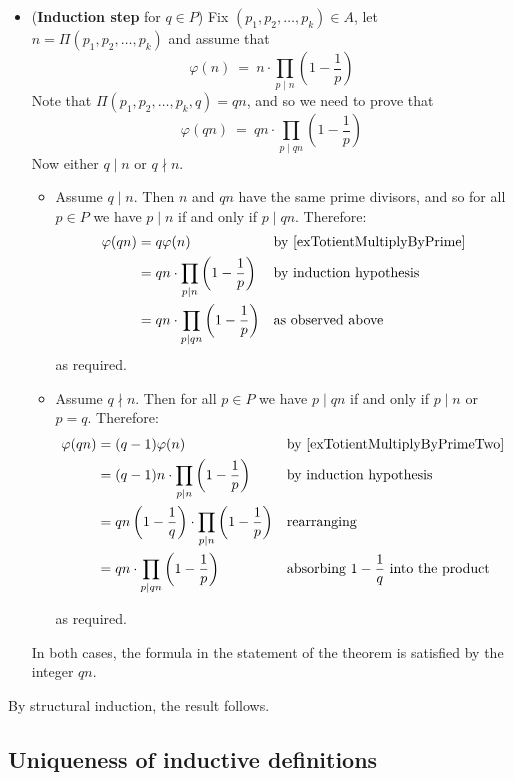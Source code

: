 \begin{cproof}
\begin{itemize}
\item (\textbf{Induction step} for $q \in P$) Fix $(p_1,p_2,\dots,p_k) \in A$, let $n = \Pi(p_1,p_2,\dots,p_k)$ and assume that
\[ \varphi(n) ~=~ n \cdot \prod_{p \mid n} \left( 1 - \frac{1}{p} \right) \]
Note that $\Pi(p_1,p_2,\dots,p_k,q) = qn$, and so we need to prove that
\[ \varphi(qn) ~=~ qn \cdot \prod_{p \mid qn} \left( 1 - \frac{1}{p} \right) \]
Now either $q \mid n$ or $q \nmid n$.
\begin{itemize}
\item Assume $q \mid n$. Then $n$ and $qn$ have the same prime divisors, and so for all $p \in P$ we have $p \mid n$ if and only if $p \mid qn$. Therefore:
\begin{align*}
\varphi(qn) &= q\varphi(n) && \text{by \Cref{exTotientMultiplyByPrime}} \\
&= qn \cdot \prod_{p \mid n} \left( 1-\frac{1}{p} \right) && \text{by induction hypothesis} \\
&= qn \cdot \prod_{p \mid qn} \left( 1-\frac{1}{p} \right) && \text{as observed above}
\end{align*}
as required.

\item Assume $q \nmid n$. Then for all $p \in P$ we have $p \mid qn$ if and only if $p \mid n$ or $p=q$. Therefore:
\begin{align*}
\varphi(qn) &= (q-1)\varphi(n) && \text{by \Cref{exTotientMultiplyByPrimeTwo}} \\
&= (q-1) n \cdot \prod_{p \mid n} \left( 1 - \frac{1}{p} \right) && \text{by induction hypothesis} \\
&= qn \left( 1 - \frac{1}{q} \right) \cdot \prod_{p \mid n} \left( 1 - \frac{1}{p} \right) && \text{rearranging} \\
&= qn \cdot \prod_{p \mid qn} \left( 1 - \frac{1}{p} \right) && \text{absorbing $1-\frac{1}{q}$ into the product}
\end{align*}

as required.
\end{itemize}

In both cases, the formula in the statement of the theorem is satisfied by the integer $qn$.
\end{itemize}

By structural induction, the result follows.
\end{cproof}

\subsection*{Uniqueness of inductive definitions}

